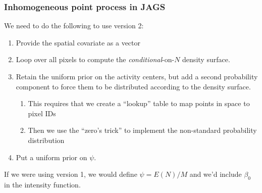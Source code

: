 \documentclass[color=usenames,dvipsnames]{beamer}\usepackage[]{graphicx}\usepackage[]{xcolor}
\begin{document}
\begin{frame}
  \frametitle{Inhomogeneous point process in JAGS}
  We need to do the following to use version 2:
  \begin{enumerate}
    \item Provide the spatial covariate as a vector
    \item Loop over all pixels to compute the {\it conditional}-on-$N$
      density surface. 
    \item Retain the uniform prior on the activity centers, but add a
      second probability component to force them to be distributed
      according to the density surface.
      \begin{enumerate}
        \item This requires that we create a ``lookup'' table to map
          points in space to pixel IDs
        \item Then we use the ``zero's trick'' to implement the
          non-standard probability distribution
      \end{enumerate}
    \item Put a uniform prior on $\psi$.
  \end{enumerate}
  \pause
  \vfill
  If we were using version 1, we would define $\psi=E(N)/M$ and we'd
  include $\beta_0$ in the intensity function.
\end{frame}
\end{document}
